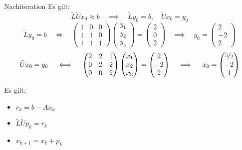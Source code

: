 \begin{example}{Nachiteration}
    Es gilt:
    \[
        \tilde{L} \tilde{U} x_0 \approx b \quad \implies \quad \tilde{L} y_0 = b, \quad \tilde{U} x_0 = y_0
    \]
    \[
        \tilde{L} y_0 = b \quad \iff \quad \begin{pmatrix}
            1 & 0 & 0 \\
            1 & 1 & 0 \\
            1 & 1 & 1
        \end{pmatrix}
        \begin{pmatrix}
            y_1 \\
            y_2 \\
            y_3
        \end{pmatrix}
        =
        \begin{pmatrix}
            2 \\
            0 \\
            2
        \end{pmatrix}
        \quad \implies \quad
        y_0 = \begin{pmatrix}
            2  \\
            -2 \\
            2
        \end{pmatrix}
    \]
    \[
        \tilde{U} x_0 = y_0 \quad \iff \quad \begin{pmatrix}
            2 & 2 & 1 \\
            0 & 2 & 2 \\
            0 & 0 & 2
        \end{pmatrix}
        \begin{pmatrix}
            x_1 \\
            x_2 \\
            x_3
        \end{pmatrix}
        =
        \begin{pmatrix}
            2  \\
            -2 \\
            2
        \end{pmatrix}
        \quad \implies \quad
        x_0 = \begin{pmatrix}
            \nicefrac{5}{2} \\
            -2              \\
            1
        \end{pmatrix}
    \]

    Es gilt:
    \begin{itemize}
        \item $r_k = b - A x_k$
        \item $\tilde{L} \tilde{U} p_k = r_k$
        \item $x_{k+1} = x_k + p_k$
    \end{itemize}


\end{example}
